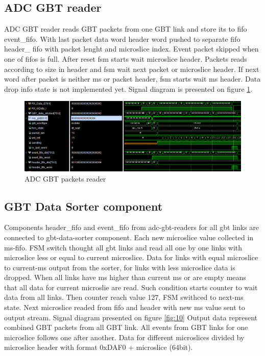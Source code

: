 \documentclass{article}
\begin{document}
\subsection{ADC GBT reader}
ADC GBT reader reads GBT packets from one GBT link and store its to fifo event\_fifo. With last packet data word header word pushed to separate fifo header\_ fifo with packet lenght and microslice index. Event packet skipped when one of fifos is full. After reset fsm starts wait microslice header. Packets reads according to size in header and fsm wait next packet or microslice header. If next word after packet is neither ms or packet header, fsm starts wait ms header. Data drop info state is not implemented yet. Signal diagram is presented on figure \ref{fig:11}. 

\begin{figure}[H]
	\centering 
	\includegraphics[width=1.0\textwidth]{ADC_GBT_reader_wave.png}
	\caption{\label{fig:11} ADC GBT packets reader}
\end{figure}

\subsection{GBT Data Sorter component}
Components header\_fifo and event\_fifo from adc-gbt-readers for all gbt links are connected to gbt-data-sorter component. Each new microslice value collected in ms-fifo. FSM switch thought all gbt links and read all one by one links with microslice less or equal to current microslice. Data for links with equal microslice to current-ms output from the sorter, for links with less microslice data is dropped. When all links have ms higher than current ms or are empty means that all data for current microslie are read. Such condition starts counter to wait data from all links. Then counter reach value 127, FSM swithced to next-ms state. Next microslice readed from fifo and header with new ms value sent to output stream. Signal diagram presented on figure \ref{fig:10} Output data represent combined GBT packets from all GBT link. All events from GBT links for one microslice follows one after another. Data for different microslices divided by microslice header with format 0xDAF0 + microslice (64bit). 
\end{document}
